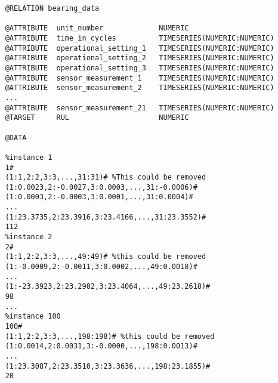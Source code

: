 \begin{verbatim}
    @RELATION bearing_data

    @ATTRIBUTE	unit_number             NUMERIC
    @ATTRIBUTE	time_in_cycles          TIMESERIES(NUMERIC:NUMERIC)
    @ATTRIBUTE	operational_setting_1   TIMESERIES(NUMERIC:NUMERIC)
    @ATTRIBUTE	operational_setting_2   TIMESERIES(NUMERIC:NUMERIC)
    @ATTRIBUTE	operational_setting_3   TIMESERIES(NUMERIC:NUMERIC)
    @ATTRIBUTE	sensor_measurement_1    TIMESERIES(NUMERIC:NUMERIC)
    @ATTRIBUTE	sensor_measurement_2    TIMESERIES(NUMERIC:NUMERIC)
    ...
    @ATTRIBUTE	sensor_measurement_21   TIMESERIES(NUMERIC:NUMERIC)
    @TARGET     RUL                     NUMERIC

    @DATA

    %instance 1
    1#
    (1:1,2:2,3:3,...,31:31)# %This could be removed 
    (1:0.0023,2:-0.0027,3:0.0003,...,31:-0.0006)#
    (1:0.0003,2:-0.0003,3:0.0001,...,31:0.0004)#
    ...
    (1:23.3735,2:23.3916,3:23.4166,...,31:23.3552)#
    112
    %instance 2
    2#
    (1:1,2:2,3:3,...,49:49)# %this could be removed
    (1:-0.0009,2:-0.0011,3:0.0002,...,49:0.0018)#
    ...
    (1:-23.3923,2:23.2902,3:23.4064,...,49:23.2618)#
    98
    ...
    %instance 100
    100#
    (1:1,2:2,3:3,...,198:198)# %this could be removed
    (1:0.0014,2:0.0031,3:-0.0000,...,198:0.0013)#
    ...
    (1:23.3087,2:23.3510,3:23.3636,...,198:23.1855)#
    20
\end{verbatim}
